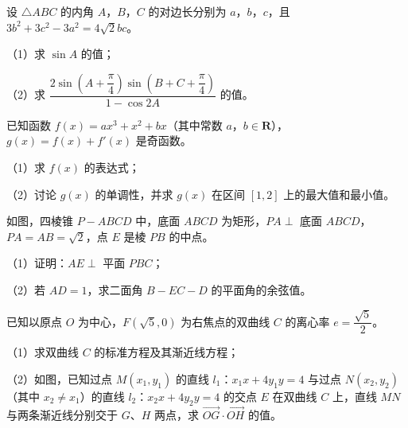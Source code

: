 \begin{question}
设 $\triangle ABC$ 的内角 $A$，$B$，$C$ 的对边长分别为 $a$，$b$，$c$，且 $3b^2+3c^2-3a^2=4\sqrt2bc$。

（1）求 $\sin A$ 的值；

（2）求 $\dfrac{2\sin\left(A+\dfrac{\pi}{4}\right)\sin\left(B+C+\dfrac{\pi}{4}\right)}{1-\cos 2A}$ 的值。

\end{question}
\begin{question}
已知函数 $f(x)=ax^3+x^2+bx$（其中常数 $a$，$b\in\mathbf R$），$g(x)=f(x)+f'(x)$ 是奇函数。

（1）求 $f(x)$ 的表达式；

（2）讨论 $g(x)$ 的单调性，并求 $g(x)$ 在区间 $[1,2]$ 上的最大值和最小值。

\Needspace{0.4\textheight}
\end{question}
\begingroup
\renewenvironment{question}{\Needspace{0.5\textheight}}{}
\begin{question}
如图，四棱锥 $P-ABCD$ 中，底面 $ABCD$ 为矩形，$PA\perp$ 底面 $ABCD$，$PA=AB=\sqrt2$，点 $E$ 是棱 $PB$ 的中点。

（1）证明：$AE\perp$ 平面 $PBC$；

（2）若 $AD=1$，求二面角 $B-EC-D$ 的平面角的余弦值。
\nopagebreak[4]
\begin{center}\end{center}
\nopagebreak[4]
\Needspace{0.4\textheight}
\end{question}
\endgroup
\begingroup
\renewenvironment{question}{\Needspace{0.5\textheight}}{}
\begin{question}
已知以原点 $O$ 为中心，$F(\sqrt5,0)$ 为右焦点的双曲线 $C$ 的离心率 $e=\dfrac{\sqrt5}{2}$。

（1）求双曲线 $C$ 的标准方程及其渐近线方程；

（2）如图，已知过点 $M(x_1,y_1)$ 的直线 $l_1$：$x_1x+4y_1y=4$ 与过点 $N(x_2,y_2)$（其中 $x_2\neq x_1$）的直线 $l_2$：$x_2x+4y_2y=4$ 的交点 $E$ 在双曲线 $C$ 上，直线 $MN$ 与两条渐近线分别交于 $G$、$H$ 两点，求 $\overrightarrow{OG}\cdot\overrightarrow{OH}$ 的值。
\nopagebreak[4]
\begin{center}\end{center}
\nopagebreak[4]

\end{question}
\endgroup